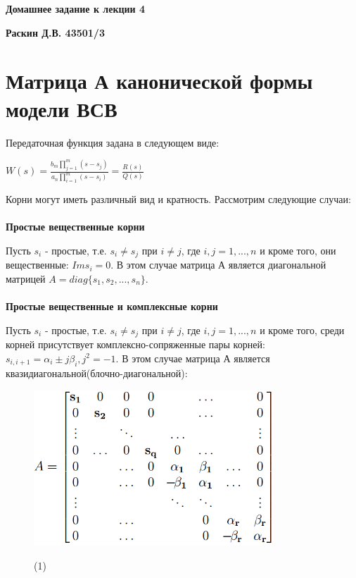 \documentclass[12pt,a4paper,oneside]{article}
\newcommand\textbox[1]{%
	\parbox{.5\textwidth}{#1}%
}
\begin{document}
\noindent\textbox{\textbf{Домашнее задание к лекции 4}\hfill}\textbox{\hfill \textbf{Раскин Д.В. 43501/3}}
\section*{Матрица А канонической формы модели ВСВ}
Передаточная функция задана в следующем виде:

$W(s)=\frac{b_m\prod_{j=1}^{m}(s-s_j)}{a_n\prod_{i=1}^{m}(s-s_i)}=\frac{R(s)}{Q(s)}$

Корни могут иметь различный вид и кратность. Рассмотрим следующие случаи:\\\\
\textbf{Простые вещественные корни}

Пусть $s_i$ - простые, т.е. $s_i\neq s_j$ при $i\neq j$, где $i,j=1,...,n$ и кроме того, они вещественные: $Im s_i=0$. В этом случае матрица А является диагональной матрицей $A=diag\{s_1, s_2,..., s_n\}$.\\\\
\textbf{Простые вещественные и комплексные корни}

Пусть $s_i$ - простые, т.е. $s_i\neq s_j$ при $i\neq j$, где $i,j=1,...,n$ и кроме того, среди корней присутствует комплексно-сопряженные пары корней: $s_{i,i+1}=\alpha_i\pm j\beta_i, j^2=-1$. В этом случае матрица А является квазидиагональной(блочно-диагональной):

\begin{figure}[H]
	\centering
	\begin{minipage}{.4\textwidth}
		\centering
		\includegraphics[width=9cm]{Drawable/1}
	\end{minipage}%
	\begin{minipage}{.4\textwidth}
		\centering
		(1)
	\end{minipage}
\end{figure}
\end{document}
